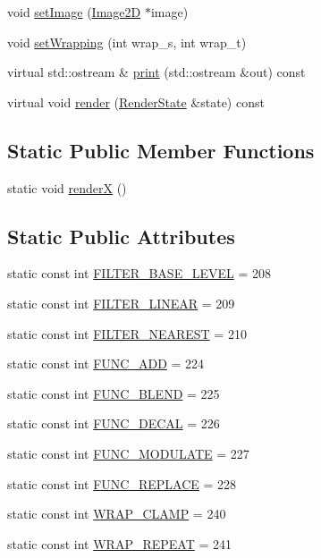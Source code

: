 \begin{CompactItemize}
\item 
void \hyperlink{classm3g_1_1Texture2D_705b89b41cd1b38f664ed912be44baaa}{setImage} (\hyperlink{classm3g_1_1Image2D}{Image2D} $\ast$image)
\item 
void \hyperlink{classm3g_1_1Texture2D_e676f34bd2f5ee1508ad1cb771702d8f}{setWrapping} (int wrap\_\-s, int wrap\_\-t)
\item 
virtual std::ostream \& \hyperlink{classm3g_1_1Texture2D_6fea17fa1532df3794f8cb39cb4f911f}{print} (std::ostream \&out) const 
\item 
virtual void \hyperlink{classm3g_1_1Texture2D_8babc8a79b78615da51161e94029eea9}{render} (\hyperlink{structm3g_1_1RenderState}{RenderState} \&state) const 
\end{CompactItemize}
\subsection*{Static Public Member Functions}
\begin{CompactItemize}
\item 
static void \hyperlink{classm3g_1_1Texture2D_443a7a301f77f625335ecc06d13bad06}{renderX} ()
\end{CompactItemize}
\subsection*{Static Public Attributes}
\begin{CompactItemize}
\item 
static const int \hyperlink{classm3g_1_1Texture2D_d1924d32385b5353ad11ecd8b1ec0ad5}{FILTER\_\-BASE\_\-LEVEL} = 208
\item 
static const int \hyperlink{classm3g_1_1Texture2D_5f06003f50141919a3665d22f55602a8}{FILTER\_\-LINEAR} = 209
\item 
static const int \hyperlink{classm3g_1_1Texture2D_1ee2e06d6462fdafd5f17e63eddfb8fe}{FILTER\_\-NEAREST} = 210
\item 
static const int \hyperlink{classm3g_1_1Texture2D_825ea3aff59f79958257ac557c802760}{FUNC\_\-ADD} = 224
\item 
static const int \hyperlink{classm3g_1_1Texture2D_57e3e01014bbfd62b8665586fdd2ecb3}{FUNC\_\-BLEND} = 225
\item 
static const int \hyperlink{classm3g_1_1Texture2D_235b942b18219513ca4a5a8c1a3171ac}{FUNC\_\-DECAL} = 226
\item 
static const int \hyperlink{classm3g_1_1Texture2D_4482b0d4d6d1f64aaf33c3c5862de30e}{FUNC\_\-MODULATE} = 227
\item 
static const int \hyperlink{classm3g_1_1Texture2D_14f24332e168c5e210ddad47fb5cdd17}{FUNC\_\-REPLACE} = 228
\item 
static const int \hyperlink{classm3g_1_1Texture2D_e36d8facf5b60eb6c59888121731c438}{WRAP\_\-CLAMP} = 240
\item 
static const int \hyperlink{classm3g_1_1Texture2D_b37ff061b9fb272284c4c389deec9266}{WRAP\_\-REPEAT} = 241
\end{CompactItemize}


